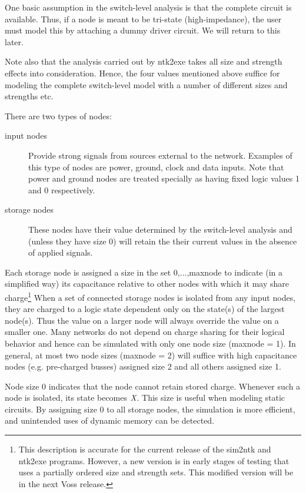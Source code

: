 One basic assumption in the switch-level analysis is that the complete
circuit is available.
Thus, if a node is meant to be tri-state (high-impedance), the user must
model this by attaching a dummy driver circuit.
We will return to this later.

Note also that the analysis carried out by ntk2exe takes all size
and strength effects into consideration.
Hence, the four values mentioned above suffice for modeling the
complete switch-level model with a number of different sizes and strengths etc.

There are two types of nodes:
\begin{description}
\item[input nodes]
Provide strong signals from sources external to the network.
Examples of this type of nodes are power, ground, clock and data inputs.
Note that power and ground nodes are treated specially as having fixed
logic values 1 and 0 respectively.
\item[storage nodes]
These nodes have their value determined by the switch-level analysis
and (unless they have size 0) will retain the their current values
in the absence of applied signals.
\end{description}

Each storage node is assigned a size in the set {0,...,maxnode} to
indicate (in a simplified way) its capacitance relative to other nodes with
which it may share charge\footnote{This description is accurate for the current
release of the sim2ntk and ntk2exe programs. However, a new version is
in early stages of testing that uses a partially ordered size and strength sets.
This modified version will be in the next Voss release.}
When a set of connected storage nodes is isolated from any input nodes, they
are charged to a logic state dependent only on the state(s) of the largest
node(s). Thus the value on a larger node will always override the value on
a smaller one. Many networks do not depend on charge sharing for their logical
behavior and hence can be simulated with only one node size (maxnode = 1).
In general, at most two node sizes (maxnode = 2) will suffice with high
capacitance nodes (e.g. pre-charged busses) assigned size 2 and all
others assigned size 1.

Node size 0 indicates that the node cannot retain stored charge. Whenever
such a node is isolated, its state becomes $\mbox{\em X}$. This size is useful when
modeling static circuits. By assigning size 0 to all storage nodes, the
simulation is more efficient, and unintended uses of dynamic memory
can be detected.

